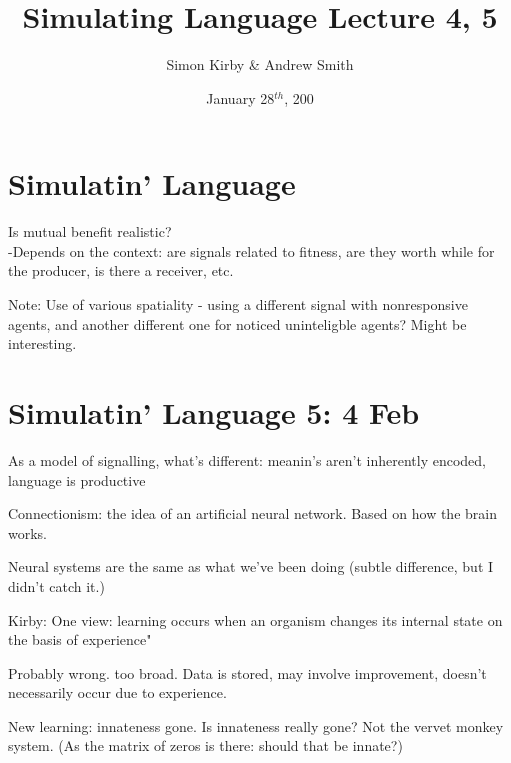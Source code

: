 \documentclass[11pt]{amsart}
\title{Simulating Language Lecture 4, 5}
\author{Simon Kirby \& Andrew Smith}
\date{January 28$^{th}$, 200}                                           %
\begin{document}
\maketitle
\section{Simulatin' Language}

Is mutual benefit realistic?\\ \indent
-Depends on the context: are signals related to fitness, are they worth while for the producer, is there a receiver, etc.

Note: Use of various spatiality - using a different signal with nonresponsive agents, and another different one for noticed uninteligble agents? Might be interesting.

\section{Simulatin' Language 5: 4 Feb}
 
 As a model of signalling, what's different: meanin's aren't inherently encoded, language is productive
 
 Connectionism: the idea of an artificial neural network. Based on how the brain works. 
 
 Neural systems are the same as what we've been doing (subtle difference, but I didn't catch it.)
 
 Kirby: One view: learning occurs when an organism changes its internal state on the basis of experience"
 
 Probably wrong. too broad. Data is stored, may involve improvement, doesn't necessarily occur due to experience. 
 
 New learning: innateness gone. Is innateness really gone? Not the vervet monkey system. (As the matrix of zeros is there: should that be innate?)
\end{document}
